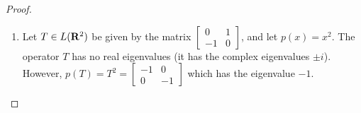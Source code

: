 \documentclass[11pt]{amsart}
\begin{document}
\begin{enumerate}[(1)]
\begin{proof}
\begin{enumerate}
\item Let $T \in L(\mathbf{R}^2)$ be given by the matrix $\begin{bmatrix} 0 & 1 \\ -1 & 0 \end{bmatrix}$, and let $p(x) = x^2$. The operator $T$ has no real eigenvalues (it has the complex eigenvalues $\pm i$). However, $p(T) = T^2 = \begin{bmatrix} -1 & 0 \\ 0 & -1 \end{bmatrix}$ which has the eigenvalue $-1$.

\end{enumerate}
\end{proof}

\end{enumerate}
\end{document}
